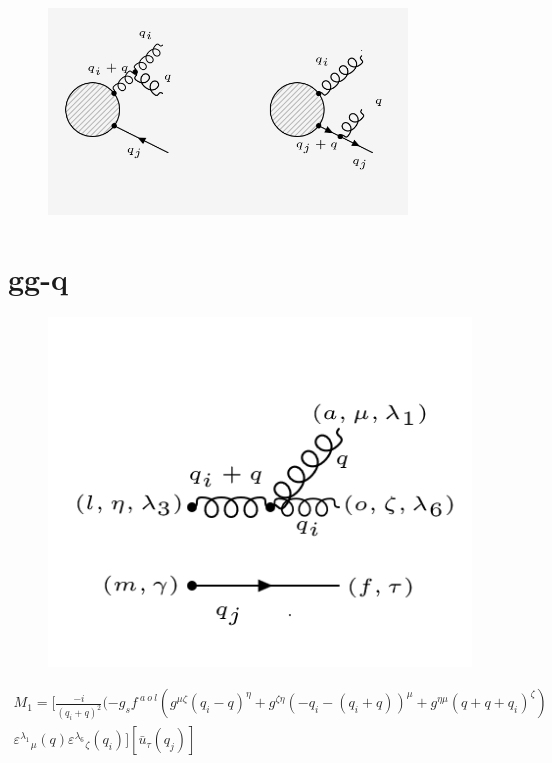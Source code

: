 

\begin{figure}[ht!]
\centering
\includegraphics[width=0.85\textwidth]{images/ggq-diagrams.png}
\end{figure}
\pagebreak
\section{gg-q}
\begin{figure}[ht!]
\centering
\includegraphics[scale=0.7]{images/ggqM1.png}
\end{figure}
\begin{equation}
\begin{split}
M_1=[\frac{-i}{(q_i +q)^2}(-g_s f^{\:a\:o\:l}(g^{{\mu}{\zeta}}(q_i -q)^{\eta}+g^{{\zeta}{\eta}}(-q_i-(q_i +q))^{\mu}+g^{{\eta}{\mu}}(q +q+q_i)^{\zeta})\\
{\varepsilon^{\lambda_1}}_{\mu} (q) {\varepsilon^{\lambda_6}}_{\zeta} (q_i)][\bar{u}_{\tau}(q_j)]
\end{split}
\end{equation}

